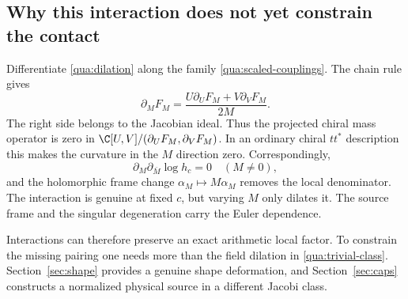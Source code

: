 \subsection{Why this interaction does not yet constrain the contact}
Differentiate \eqref{qua:dilation} along the family \eqref{qua:scaled-couplings}. The chain rule gives
\begin{equation}\label{qua:trivial-class}
\partial_M F_M=\frac{U\partial_UF_M+V\partial_VF_M}{2M}.
\end{equation}
The right side belongs to the Jacobian ideal. Thus the projected chiral mass operator is zero in
$\C[U,V]/(\partial_UF_M,\partial_VF_M)$. In an ordinary chiral $tt^*$ description this makes the curvature in the $M$ direction zero. Correspondingly,
\[
\partial_M\partial_{\bar M}\log h_c=0\quad(M\ne0),
\]
and the holomorphic frame change $\alpha_M\mapsto M\alpha_M$ removes the local denominator. The interaction is genuine at fixed $c$, but varying $M$ only dilates it. The source frame and the singular degeneration carry the Euler dependence.

Interactions can therefore preserve an exact arithmetic local factor.
To constrain the missing pairing one needs more than the field
dilation in \eqref{qua:trivial-class}. Section~\ref{sec:shape}
provides a genuine shape deformation, and Section~\ref{sec:caps}
constructs a normalized physical source in a different Jacobi class.
